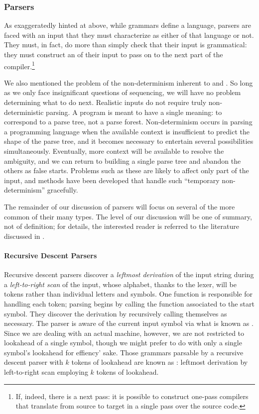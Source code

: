 \subsubsection{Parsers}
As exaggeratedly hinted at above, while grammars define a language, parsers are faced with an input that they must characterize as either of that language or not. They must, in fact, do more than simply check that their input is grammatical: they must construct an \IR of their input to pass on to the next part of the compiler.\footnote{If, indeed, there is a next pass: it is possible to construct one-pass compilers that translate from source to target in a single pass over the source code.}

We also mentioned the problem of the non-determinism inherent to \CFGs and \PDAs. So long as we only face insignificant questions of sequencing, we will have no problem determining what to do next. Realistic inputs do not require truly non-deterministic parsing. A program is meant to have a single meaning: to correspond to a parse tree, not a parse forest. Non-determinism occurs in parsing a programming language when the available context is insufficient to predict the shape of the parse tree, and it becomes necessary to entertain several possibilities simultaneously. Eventually, more context will be available to resolve the ambiguity, and we can return to building a single parse tree and abandon the others as false starts. Problems such as these are likely to affect only part of the input, and methods have been developed that handle such ``temporary non-determinism'' gracefully. %

The remainder of our discussion of parsers will focus on several of the more common of their many types. The level of our discussion will be one of summary, not of definition; for details, the interested reader is referred to the literature discussed in .

\paragraph{Recursive Descent Parsers}
Recursive descent parsers discover a \emph{leftmost derivation} of the input string during a \emph{left-to-right scan} of the input, whose alphabet, thanks to the lexer, will be tokens rather than individual letters and symbols. One function is responsible for handling each token; parsing begins by calling the function associated to the start symbol. They discover the derivation by recursively calling themselves as necessary. The parser is aware of the current input symbol via what is known as . Since we are dealing with an actual machine, however, we are not restricted to lookahead of a single symbol, though we might prefer to do with only a single symbol's lookahead for effiency' sake. Those grammars parsable by a recursive descent parser with $k$ tokens of lookahead are known as : leftmost derivation by left-to-right scan employing $k$ tokens of lookahead.

